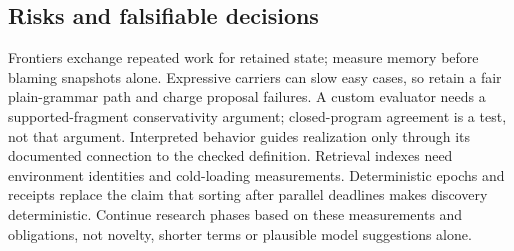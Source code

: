 \subsection{Risks and falsifiable decisions}

Frontiers exchange repeated work for retained state; measure memory before
blaming snapshots alone. Expressive carriers can slow easy cases, so retain
a fair plain-grammar path and charge proposal failures. A custom evaluator
needs a supported-fragment conservativity argument; closed-program agreement
is a test, not that argument. Interpreted behavior guides realization only
through its documented connection to the checked definition. Retrieval indexes
need environment identities and cold-loading measurements. Deterministic
epochs and receipts replace the claim that sorting after parallel deadlines
makes discovery deterministic. Continue research phases based on these
measurements and obligations, not novelty, shorter terms or plausible model
suggestions alone.
